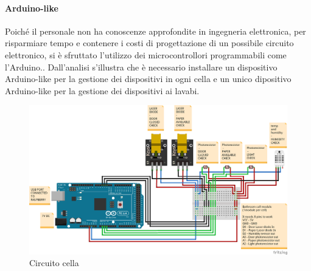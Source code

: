 \documentclass[12pt]{article}
\begin{document}
\paragraph{Arduino-like}
Poiché il personale non ha conoscenze approfondite in ingegneria elettronica, per risparmiare tempo e contenere i costi di progettazione di un possibile circuito elettronico, si è sfruttato l'utilizzo dei microcontrollori programmabili come l'Arduino..
Dall'analisi s'illustra che è necessario installare un dispositivo Arduino-like per la gestione dei dispositivi in ogni cella e un unico dipositivo Arduino-like per la gestione dei dispositivi ai lavabi.\\
 \begin{figure}[h!]
\centering
	\includegraphics[scale=0.45]{img/RestroomCell_bb.png}  
    \caption{Circuito cella}
\end{figure}
\end{document}
